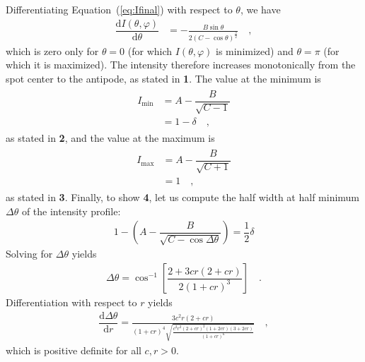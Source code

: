 \documentclass[modern]{aastex62}
\begin{document}
Differentiating Equation~(\ref{eq:Ifinal}) with respect to $\theta$, we have
%
\begin{align}
    \label{eq:Ideriv}
    \dfrac{\mathrm{d}I(\theta, \varphi)}{\mathrm{d}\theta} & =
    -\frac{B\sin\theta}{2(C - \cos\theta)^\frac{3}{2}}
    \quad,
\end{align}
%
which is zero only for $\theta = 0$ (for which $I(\theta, \varphi)$ is
minimized) and $\theta = \pi$ (for which it is maximized). The intensity
therefore increases monotonically from the spot center to the antipode,
as stated in \textbf{1}. The value at the minimum is
%
\begin{align}
    \begin{split}
        I_{\mathrm{min}} & = A - \dfrac{B}{\sqrt{C - 1}} \\
        & = 1 - \delta
        \quad,
    \end{split}
\end{align}
%
as stated in \textbf{2}, and the value at the maximum is
%
\begin{align}
    \begin{split}
        I_{\mathrm{max}} & = A - \dfrac{B}{\sqrt{C + 1}} \\
        & = 1
        \quad,
    \end{split}
\end{align}
%
as stated in \textbf{3}.
Finally, to show \textbf{4}, let us compute the half width at half minimum
$\Delta\theta$ of the intensity profile:
%
\begin{align}
    1 - \left(A - \dfrac{B}{\sqrt{C - \cos{\Delta\theta}}}\right) =
    \dfrac{1}{2}\delta
\end{align}
%
Solving for $\Delta\theta$ yields
%
\begin{align}
    \Delta\theta =
    \cos^{-1} \left[ \dfrac{2 + 3 c r (2 + c r)}{2 (1 + c r)^3} \right]
    \quad.
\end{align}
%
Differentiation with respect to $r$ yields
%
\begin{align}
    \dfrac{\mathrm{d}\Delta\theta}{\mathrm{d}r} =
    \frac{3 c^2 r \left(2 + c r\right)}{\left(1 + c r\right)^4
        \sqrt{\frac{c^2 r^2 \left(2 + c r\right)^2 \left(1 + 2 c r\right)
                \left(3 + 2 c r\right)}{\left(1 + c r\right)^6}}}
    \quad,
\end{align}
%
which is positive definite for all $c, r > 0$.
\end{document}
